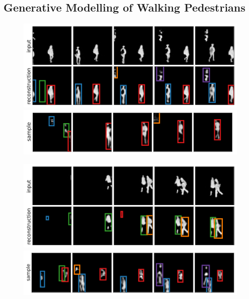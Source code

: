 \subsection{Generative Modelling of Walking Pedestrians}
\label{sec:expr_duke}

\begin{figure}
    \centering
    \begin{minipage}[c]{0.49\linewidth}
        \centering
        \includegraphics[width=\linewidth]{figures/SQAIR/duke_rec/front/000065}
        \includegraphics[width=\linewidth]{figures/SQAIR/duke_sample/front/sqair_duke_sample_with_label_296}
    \end{minipage}
    \hfill
    \begin{minipage}[c]{0.49\linewidth}
        \centering
        \includegraphics[width=\linewidth]{figures/SQAIR/duke_rec/front/000099}
       \includegraphics[width=\linewidth]{figures/SQAIR/duke_sample/front/sqair_duke_sample_with_label_020}

\end{minipage}
\end{figure}
